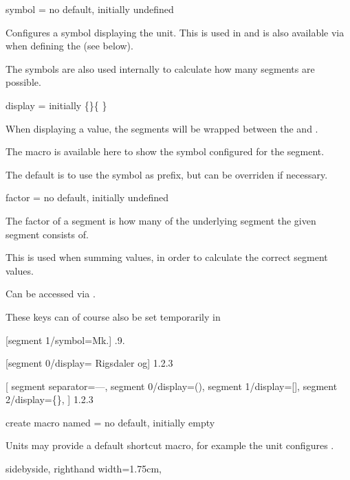 \documentclass{article}
\begin{document}
\begin{docKey}
	[segment 0]{symbol}
	{=}
	{no default, initially undefined}

	Configures a symbol displaying the unit. This is used in  and is also available via  when defining the  (see below).
	
	The symbols are also used internally to calculate how many segments are possible.
\end{docKey}

\begin{docKey}
	[segment 0]
	{display}
	{=}
	{initially \{\}\{ \}}

	When displaying a value, the segments will be wrapped between the  and .
	
	The macro  is available here to show the symbol configured for the segment.
	
	The default is to use the symbol as prefix, but can be overriden if necessary.
\end{docKey}

\begin{docKey}
	[segment 0]
	{factor}
	{=}
	{no default, initially undefined}
	
	The factor of a segment is how many of the underlying segment the given segment consists of.
	
	This is used when summing values, in order to calculate the correct segment values.
	
	Can be accessed via .
\end{docKey}

These keys can of course also be set temporarily in 

\begin{dispExample}
	[segment 1/symbol=Mk.]
	{.9.}

	[segment 0/display={}{ Rigsdaler og}]
	{1.2.3}

[
		segment separator={---},
		segment 0/display={(}{)},
		segment 1/display={[}{]},
		segment 2/display={\{}{\}},
	]
	{1.2.3}
\end{dispExample}

\begin{docKey}
	{create macro named}
	{=}
	{no default, initially empty}
	
	Units may provide a default shortcut macro, for example the  unit configures .

\begin{dispExample*}{
	sidebyside,
	righthand width=1.75cm,
}
\end{dispExample*}
\end{docKey}
\end{document}
